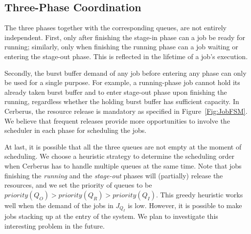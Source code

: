 \subsection{Three-Phase Coordination}
The three phases together with the corresponding queues, are not entirely independent.
First, only after finishing the stage-in phase can a job be ready for running;
similarly, only when finishing the running phase can a job waiting or entering the stage-out phase.
This is reflected in the lifetime of a job's execution.

Secondly,  the burst buffer demand of any job before entering any phase can only be used for a single purpose.
For example, a running-phase job cannot hold its already taken burst buffer
and to enter stage-out phase upon finishing the running, regardless whether the holding burst buffer has sufficient capacity.
In Cerberus, the resource release is mandatory as specified in Figure~\ref{Fig:JobFSM}.
We believe that frequent releases provide more opportunities to involve the scheduler in each phase for scheduling the jobs.

At last, it is possible that all the three queues are not empty at the moment of scheduling.
We choose a heuristic strategy to determine the scheduling order when
Cerberus has to handle multiple queues at the same time.
Note that jobs finishing the \textit{running} and the \textit{stage-out} phases
will (partially) release the resources, and we set the priority of queues to be $priority(Q_O) > priority(Q_R) > priority(Q_I)$.
This greedy heuristic works well when the demand of the jobs in $J_{Q_I}$ is low.
However, it is possible to make jobs stacking up at the entry of the system.
We plan to investigate this interesting problem in the future.


